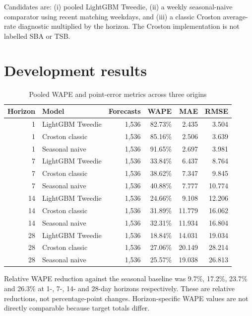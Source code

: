 \documentclass[11pt,a4paper]{article}
\begin{document}
Candidates are: (i) pooled LightGBM Tweedie, (ii) a weekly seasonal-naive comparator using recent matching weekdays, and (iii) a classic Croston average-rate diagnostic multiplied by the horizon. The Croston implementation is not labelled SBA or TSB.

\section{Development results}
\begin{table}[H]\centering\small\caption{Pooled WAPE and point-error metrics across three origins}\begin{tabular}{rlrrrr}\toprule
Horizon & Model & Forecasts & WAPE & MAE & RMSE\\\midrule
1 & LightGBM Tweedie & 1,536 & 82.73\% & 2.435 & 3.504\\
1 & Croston classic & 1,536 & 85.16\% & 2.506 & 3.639\\
1 & Seasonal naive & 1,536 & 91.65\% & 2.697 & 3.981\\\midrule
7 & LightGBM Tweedie & 1,536 & 33.84\% & 6.437 & 8.764\\
7 & Croston classic & 1,536 & 38.62\% & 7.347 & 9.845\\
7 & Seasonal naive & 1,536 & 40.88\% & 7.777 & 10.774\\\midrule
14 & LightGBM Tweedie & 1,536 & 24.66\% & 9.108 & 12.206\\
14 & Croston classic & 1,536 & 31.89\% & 11.779 & 16.062\\
14 & Seasonal naive & 1,536 & 32.31\% & 11.934 & 16.804\\\midrule
28 & LightGBM Tweedie & 1,536 & 18.84\% & 14.031 & 19.034\\
28 & Croston classic & 1,536 & 27.06\% & 20.149 & 28.214\\
28 & Seasonal naive & 1,536 & 25.57\% & 19.038 & 26.813\\\bottomrule
\end{tabular}\end{table}
Relative WAPE reduction against the seasonal baseline was 9.7\%, 17.2\%, 23.7\% and 26.3\% at 1-, 7-, 14- and 28-day horizons respectively. These are relative reductions, not percentage-point changes. Horizon-specific WAPE values are not directly comparable because target totals differ.
\end{document}
